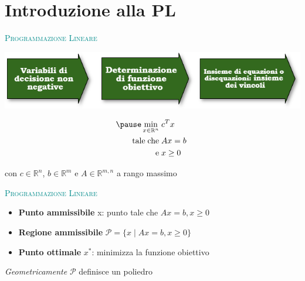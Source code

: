 \begin{frame}[t,plain]
\titlepage
\end{frame}

\begin{frame}
	\frametitle{}
	\hypersetup{linkcolor=black}
	\tableofcontents
\end{frame}




\section{Introduzione alla PL}
\begin{frame}{\textsc{\LARGE \textcolor{darkcyan}{Programmazione Lineare}}}
	\pause
	\begin{center}
	\includegraphics[width = 9 cm]{fasi.png}\pause
	\end{center}

\begin{equation*}
\begin{split}
\pause \min\limits_{x\in\mathbb{R}^{n}}\;&c^{T}x\\
\text{tale\;che\;}&Ax= b\;\\\text{e\;}&x\geq0
\end{split}
\end{equation*}
\begin{center}
con $c\in\mathbb{R}^{n}$, $b\in\mathbb{R}^{m}$ e $A\in\mathbb{R}^{m,n}$ a rango massimo 
\end{center}	
\end{frame}


\begin{frame}{\textsc{\LARGE \textcolor{darkcyan}{Programmazione Lineare}}}
	\pause
	\begin{itemize}
		\item \textbf{Punto ammissibile} x: punto tale che $Ax = b, x\geq 0$
		\item \textbf{Regione ammissibile} $\mathcal{P}=\{x\;|\; Ax = b, x\geq 0\}$
		\item \textbf{Punto ottimale} $x^{*}$: minimizza la funzione obiettivo
	\end{itemize}
\pause
\centering\emph{Geometricamente} $\mathcal{P}$ definisce un poliedro
\end{frame}

